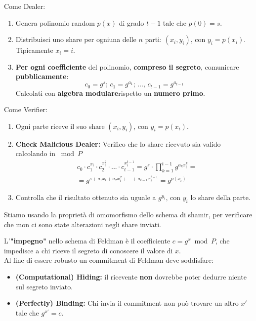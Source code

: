 \begin{theorem}\label{thm:feldvss}
Come Dealer:
\begin{enumerate}
    \item Genera polinomio random $p(x)$ di grado $t-1$ tale che $p(0)=s$.
    \item Distribuisci uno share per ogniuna delle $n$ parti: $(x_i, y_i)$, con $y_i=p(x_i)$. Tipicamente $x_i=i$.
    \item \textbf{Per ogni coefficiente} del polinomio, \textbf{compreso il segreto}, comunicare \textbf{pubblicamente}:
    \[c_0=g^s;\,c_1=g^{a_1};\,\dots,\,c_{t-1}=g^{a_{t-1}}\]
    Calcolati con \textbf{algebra modulare}\footnotemark rispetto un \textbf{numero primo}.
\end{enumerate}
Come Verifier:
\begin{enumerate}
    \item Ogni parte riceve il suo share $(x_i, y_i)$, con $y_i=p(x_i)$.
    \item \textbf{Check Malicious Dealer:} Verifico che lo share ricevuto sia valido calcolando in $\bmod{P}$
    \begin{equation*}
        \begin{aligned}
            &c_0\cdot c_1^{x_i}\cdot c_2^{x_i^2}\cdot ...\cdot c_{t-1}^{x_i^{t-1}}=
            g^s\cdot\prod_ {k=1}^{t-1}g^{a_k x_i^k}=\\
            &=g^{s+a_1x_i+a_2x_i^2+\dots+a_{t-1}x_i^{t-1}}=g^{p(x_i)}
        \end{aligned}
    \end{equation*}
    \item Controlla che il risultato ottenuto sia uguale a $g^{y_i}$, con $y_i$ lo share della parte.
\end{enumerate}
\end{theorem}\pagebreak
\begin{note}
Stiamo usando la proprietà di omomorfismo dello schema di shamir, per verificare che mon ci sono state alterazioni negli share inviati.
\end{note}
\begin{definition}\label{def:commitment}
L'\textbf{"impegno"} nello schema di Feldman è il coefficiente $c=g^x\bmod{P}$, che impedisce a chi riceve il segreto di conoscere il valore di $x$.\\
Al fine di essere robusto un commitment di Feldman deve soddisfare:
\begin{itemize}
    \item \textbf{(Computational) Hiding:} il ricevente \textbf{non} dovrebbe poter dedurre niente sul segreto inviato.
    \item \textbf{(Perfectly) Binding:} Chi invia il commitment non può trovare un altro $x'$ tale che $g^{x'}=c$.\footnotemark
\end{itemize}
\end{definition}
